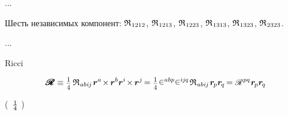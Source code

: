 \begin{otherlanguage}{russian}
...

Шесть независимых компонент:
${\mathfrak{R}_{\hspace{.1ex}1212}}$, ${\mathfrak{R}_{\hspace{.1ex}1213}}$, ${\mathfrak{R}_{\hspace{.1ex}1223}}$, ${\mathfrak{R}_{\hspace{.1ex}1313}}$, ${\mathfrak{R}_{\hspace{.1ex}1323}}$, ${\mathfrak{R}_{\hspace{.1ex}2323}}$.

...

  Ricci

\begin{equation*}
\hspace{.1ex}\pmb{\scalebox{1.2}[1]{$\mathscr{R}$}} \equiv
\smalldisplaystyleonefourth \hspace{.4ex} \mathfrak{R}_{\hspace{.1ex}abi\hspace{-0.1ex}j} \hspace{.2ex} \bm{r}^a \hspace{-0.3ex} \times \hspace{-0.15ex} \bm{r}^b \bm{r}^i \hspace{-0.3ex} \times \hspace{-0.15ex} \bm{r}^j \hspace{-0.25ex}
= \smalldisplaystyleonefourth \hspace{.15ex} \levicivita^{abp} \levicivita^{i\hspace{-0.1ex}j\hspace{-0.1ex}q} \hspace{.25ex} \mathfrak{R}_{\hspace{.1ex}abi\hspace{-0.1ex}j} \hspace{.2ex} \bm{r}_{\hspace{-0.2ex}p} \bm{r}_{\hspace{-0.2ex}q} \hspace{-0.2ex}
= \mathscr{R}^{\hspace{.1ex}pq} \hspace{.1ex} \bm{r}_{\hspace{-0.2ex}p} \bm{r}_{\hspace{-0.2ex}q}
\end{equation*}

\vspace{-0.2em} \noindent (~$\onefourth$ ) 


\end{otherlanguage}
